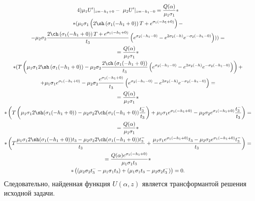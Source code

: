 \documentclass[a4paper, 12pt]{article}
\newcommand{\s}[1]{\sigma_{#1}}
\newcommand{\m}[1]{\mu_{#1}}
\newcommand{\E}[2]{e^{#1 #2}}
\begin{document}
\begin{multline}
    4)\mu_1  U'|_{z=-h_1+0}-\ \mu_2  U'|_{z=-h_1-0}=\frac{Q(\alpha)}{\m{1} \s{1}}*\\
    *( \m{1}\s{1}\left( 2\sh \left(\s{1}(-h_1+0) \right)T+\E{\s{1}}{(-h_1+0)}\right)-\\
    -\m{2}\s{2} \frac{2\ch \left(\s{1}(-h_1+0) \right)T+\E{\s{1}}{(-h_1+0)}}{t_3}\left(\E{\s{2}}{(-h_1-0)}- \E{2\s{2}}{(-h)} \E{-\s{2}}{(-h_1-0)}  \right)))=\\
    =\frac{Q(\alpha)}{\m{1} \s{1}}*\\
    *( T\left(  \m{1}\s{1} 2\sh \left(\s{1}(-h_1+0)\right)-\m{2}\s{2} \frac{2\ch \left(\s{1}(-h_1+0) \right)}{t_3}\left(\E{\s{2}}{(-h_1-0)}- \E{2\s{2}}{(-h)} \E{-\s{2}}{(-h_1-0)}  \right)\right)+\\
    +\m{1}\s{1}\E{\s{1}}{(-h_1+0)}-\m{2}\s{2}\frac{\E{\s{1}}{(-h_1+0)}}{t_3}\left(\E{\s{2}}{(-h_1-0)}- \E{2\s{2}}{(-h)} \E{-\s{2}}{(-h_1-0)}  \right)=\\
    =\frac{Q(\alpha)}{\m{1} \s{1}}*\\
    *\left(T\left( \m{1}\s{1}2\sh (\s{1}(-h_1+0)) -\m{2}\s{2} 2\ch (\s{1}(-h_1+0))\frac{t_3^-}{t_3} \right) +\m{1}\s{1}\E{\s{1}}{(-h_1+0)}-\m{2}\s{2}\E{\s{1}}{(-h_1+0)} \frac{t_3^-}{t_3}\right)=\\
    =\frac{Q(\alpha)}{\m{1} \s{1}}*\\
    *\left(T\frac{\m{1}\s{1}2\sh(\s{1}(-h_1+0))t_3-\m{2}\s{2}2\ch(\s{1}(-h_1+0))t_3^-}{t_3} +  \frac{\m{1}\s{1}\E{\s{1}}{(-h_1+0)}t_3-\m{2}\s{2}\E{\s{1}}{(-h_1+0)}t_3^-}{t_3} \right)=\\
    =\frac{Q(\alpha)\E{\s{1}}{(-h_1+0)}}{\m{1} \s{1}t_3}*\\
    *\left((\m{2}\s{2}t_3^--\m{1}\s{1}t_3)+(\m{1}\s{1}t_3-\m{2}\s{2}t_3^-) \right)=0.
\end{multline}
Следовательно, найденная функция $U(\alpha,z)$ является трансформантой решения исходной задачи.
\end{document}
